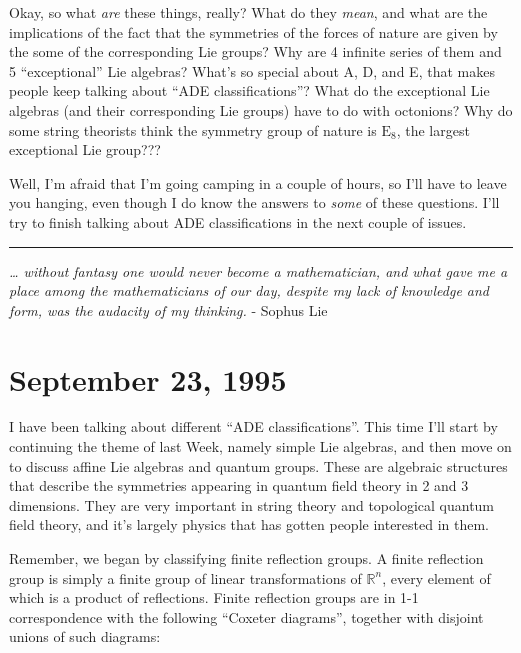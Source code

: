 \documentclass{article}
\begin{document}
Okay, so what \emph{are} these things, really? What do they \emph{mean},
and what are the implications of the fact that the symmetries of the
forces of nature are given by the some of the corresponding Lie groups?
Why are 4 infinite series of them and 5 ``exceptional'' Lie algebras?
What's so special about A, D, and E, that makes people keep talking
about ``ADE classifications''? What do the exceptional Lie algebras (and
their corresponding Lie groups) have to do with octonions? Why do some
string theorists think the symmetry group of nature is \(\mathrm{E}_8\),
the largest exceptional Lie group???

Well, I'm afraid that I'm going camping in a couple of hours, so I'll
have to leave you hanging, even though I do know the answers to
\emph{some} of these questions. I'll try to finish talking about ADE
classifications in the next couple of issues.

\begin{center}\rule{0.5\linewidth}{0.5pt}\end{center}

\emph{\ldots{} without fantasy one would never become a mathematician,
and what gave me a place among the mathematicians of our day, despite my
lack of knowledge and form, was the audacity of my thinking.} - Sophus
Lie
\hypertarget{week64}{%
\section{September 23, 1995}\label{week64}}

I have been talking about different ``ADE classifications''. This time
I'll start by continuing the theme of last Week, namely simple Lie
algebras, and then move on to discuss affine Lie algebras and quantum
groups. These are algebraic structures that describe the symmetries
appearing in quantum field theory in 2 and 3 dimensions. They are very
important in string theory and topological quantum field theory, and
it's largely physics that has gotten people interested in them.

Remember, we began by classifying finite reflection groups. A finite
reflection group is simply a finite group of linear transformations of
\(\mathbb{R}^n\), every element of which is a product of reflections.
Finite reflection groups are in 1-1 correspondence with the following
``Coxeter diagrams'', together with disjoint unions of such diagrams:
\end{document}
